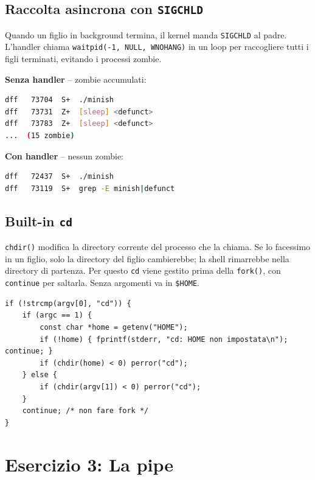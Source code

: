 \documentclass[a4paper,12pt]{article}
\begin{document}
\subsection*{Raccolta asincrona con \texttt{SIGCHLD}}

Quando un figlio in background termina, il kernel manda \texttt{SIGCHLD} al
padre. L'handler chiama \texttt{waitpid(-1, NULL, WNOHANG)} in un loop per
raccogliere tutti i figli terminati, evitando i processi zombie.

\medskip
\noindent\textbf{Senza handler} -- zombie accumulati:
\begin{lstlisting}[language=bash]
dff   73704  S+  ./minish
dff   73731  Z+  [sleep] <defunct>
dff   73783  Z+  [sleep] <defunct>
...  (15 zombie)
\end{lstlisting}

\noindent\textbf{Con handler} -- nessun zombie:
\begin{lstlisting}[language=bash]
dff   72437  S+  ./minish
dff   73119  S+  grep -E minish|defunct
\end{lstlisting}

\subsection*{Built-in \texttt{cd}}

\texttt{chdir()} modifica la directory corrente del processo che la chiama.
Se lo facessimo in un figlio, solo la directory del figlio cambierebbe; la
shell rimarrebbe nella directory di partenza. Per questo \texttt{cd} viene
gestito prima della \texttt{fork()}, con \texttt{continue} per saltarla.
Senza argomenti va in \texttt{\$HOME}.

\begin{lstlisting}[caption={Built-in cd}]
if (!strcmp(argv[0], "cd")) {
    if (argc == 1) {
        const char *home = getenv("HOME");
        if (!home) { fprintf(stderr, "cd: HOME non impostata\n"); continue; }
        if (chdir(home) < 0) perror("cd");
    } else {
        if (chdir(argv[1]) < 0) perror("cd");
    }
    continue; /* non fare fork */
}
\end{lstlisting}

\section{Esercizio 3: La pipe}
\end{document}

